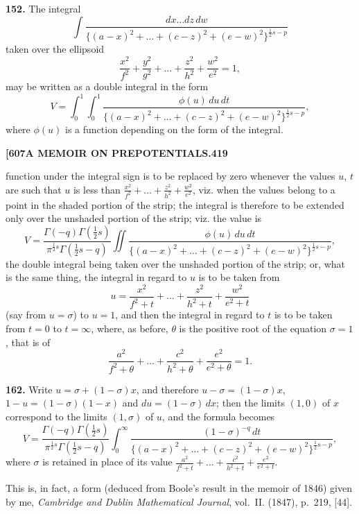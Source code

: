 \documentclass[11pt,a4paper]{book}
\begin{document}
{\medskip
\noindent\textbf{152.}
The integral
\[
\int \frac{dx\ldots dz\, dw}{\{(a-x)^2 + \ldots + (c-z)^2 + (e-w)^2\}^{\frac{1}{2}s-p}}
\]
taken over the ellipsoid
\[
\frac{x^2}{f^2} + \frac{y^2}{g^2} + \ldots + \frac{z^2}{h^2} + \frac{w^2}{e^2} = 1,
\]
may be written as a double integral in the form
\[
V = \int_0^1 \int_0^1 \frac{\phi(u)\, du\, dt}{\{(a-x)^2 + \ldots + (c-z)^2 + (e-w)^2\}^{\frac{1}{2}s-p}},
\]
where $\phi(u)$ is a function depending on the form of the integral.

\newpage
\noindent\textbf{[607}\hspace{\fill}\textbf{A MEMOIR ON PREPOTENTIALS.}\hspace{\fill}\textbf{419}

function under the integral sign is to be replaced by zero whenever the values $u$, $t$ are such that $u$ is less than $\frac{x^2}{f^2} + \ldots + \frac{z^2}{h^2} + \frac{w^2}{e^2}$, viz. when the values belong to a point in the shaded portion of the strip; the integral is therefore to be extended only over the unshaded portion of the strip; viz. the value is
\[
V = \frac{\Gamma(-q)\Gamma(\frac{1}{2}s)}{\pi^{\frac{1}{2}s}\Gamma(\frac{1}{2}s-q)} \iint \frac{\phi(u)\, du\, dt}{\{(a-x)^2 + \ldots + (c-z)^2 + (e-w)^2\}^{\frac{1}{2}s-p}},
\]
the double integral being taken over the unshaded portion of the strip; or, what is the same thing, the integral in regard to $u$ is to be taken from
\[
u = \frac{x^2}{f^2+t} + \ldots + \frac{z^2}{h^2+t} + \frac{w^2}{e^2+t}
\]
(say from $u = \sigma$) to $u = 1$, and then the integral in regard to $t$ is to be taken from $t = 0$ to $t = \infty$, where, as before, $\theta$ is the positive root of the equation $\sigma = 1$, that is of
\[
\frac{a^2}{f^2+\theta} + \ldots + \frac{c^2}{h^2+\theta} + \frac{e^2}{e^2+\theta} = 1.
\]

\medskip
\noindent\textbf{162.}
Write $u = \sigma + (1-\sigma)x$, and therefore $u - \sigma = (1-\sigma)x$, $1 - u = (1-\sigma)(1-x)$ and $du = (1-\sigma)\, dx$; then the limits $(1, 0)$ of $x$ correspond to the limits $(1, \sigma)$ of $u$, and the formula becomes
\[
V = \frac{\Gamma(-q)\Gamma(\frac{1}{2}s)}{\pi^{\frac{1}{2}s}\Gamma(\frac{1}{2}s-q)} \int_0^\infty \frac{(1-\sigma)^{-q}\, dt}{\{(a-x)^2 + \ldots + (c-z)^2 + (e-w)^2\}^{\frac{1}{2}s-p}},
\]
where $\sigma$ is retained in place of its value $\frac{a^2}{f^2+t} + \ldots + \frac{c^2}{h^2+t} + \frac{e^2}{e^2+t}$.

This is, in fact, a form (deduced from Boole's result in the memoir of 1846) given by me, \textit{Cambridge and Dublin Mathematical Journal}, vol.~II. (1847), p.~219, [44].

}
\end{document}
